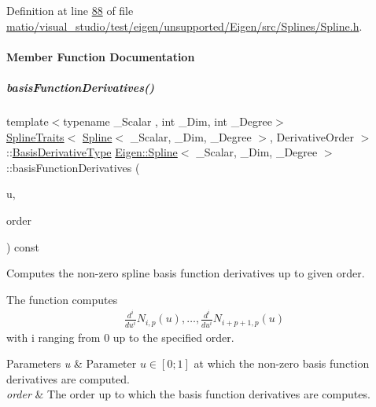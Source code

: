 Definition at line \hyperlink{matio_2visual__studio_2test_2eigen_2unsupported_2_eigen_2src_2_splines_2_spline_8h_source_l00088}{88} of file \hyperlink{matio_2visual__studio_2test_2eigen_2unsupported_2_eigen_2src_2_splines_2_spline_8h_source}{matio/visual\+\_\+studio/test/eigen/unsupported/\+Eigen/src/\+Splines/\+Spline.\+h}.



\paragraph{Member Function Documentation}
\mbox{\label{group___splines___module_a17d416e814d1ee957e5b309dc423751f}} 
\subparagraph{\texorpdfstring{basis\+Function\+Derivatives()}{basisFunctionDerivatives()}\hspace{0.1cm}{\footnotesize\ttfamily [1/4]}}
{\footnotesize\ttfamily template$<$typename \+\_\+\+Scalar , int \+\_\+\+Dim, int \+\_\+\+Degree$>$ \\
\hyperlink{struct_eigen_1_1_spline_traits}{Spline\+Traits}$<$ \hyperlink{group___splines___module_class_eigen_1_1_spline}{Spline}$<$ \+\_\+\+Scalar, \+\_\+\+Dim, \+\_\+\+Degree $>$, Derivative\+Order $>$\+::\hyperlink{group___splines___module_a9db0b0108353660cd03524f2e67d6b3c}{Basis\+Derivative\+Type} \hyperlink{group___splines___module_class_eigen_1_1_spline}{Eigen\+::\+Spline}$<$ \+\_\+\+Scalar, \+\_\+\+Dim, \+\_\+\+Degree $>$\+::basis\+Function\+Derivatives (\begin{DoxyParamCaption}\item[{\hyperlink{group___splines___module_a8cafd78b564825c76fbb3419653d9742}{Scalar}}]{u,  }\item[{Dense\+Index}]{order }\end{DoxyParamCaption}) const}



Computes the non-\/zero spline basis function derivatives up to given order. 

The function computes \begin{align*} \frac{d^i}{du^i} N_{i,p}(u), \hdots, \frac{d^i}{du^i} N_{i+p+1,p}(u) \end{align*} with i ranging from 0 up to the specified order.


\begin{DoxyParams}{Parameters}
{\em u} & Parameter $u \in [0;1]$ at which the non-\/zero basis function derivatives are computed. \\
\hline
{\em order} & The order up to which the basis function derivatives are computes. \\
\hline
\end{DoxyParams}


